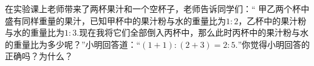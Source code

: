 在实验课上老师带来了两杯果汁和一个空杯子，老师告诉同学们：“ 甲乙两个杯中盛有同样重量的果汁，已知甲杯中的果汁粉与水的重量比为$1:2$，乙杯中的果汁粉与水的重量比为$1:3$.现在我将它们全部倒入丙杯中，那么此时丙杯中的果汁粉与水的重量比为多少呢？”小明回答道：“$(1+1):(2+3)=2:5.$”你觉得小明回答的正确吗？为什么？